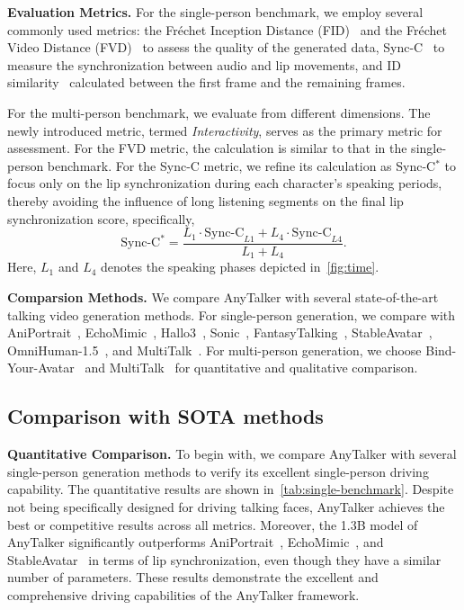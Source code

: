 \noindent \textbf{Evaluation Metrics.}
For the single-person benchmark, we employ several commonly used metrics: the Fréchet Inception Distance (FID)~\cite{heusel2017gans} and the Fréchet Video Distance (FVD)~\cite{unterthiner2019fvd} to assess the quality of the generated data, Sync-C~\cite{chung2016out} to measure the synchronization between audio and lip movements, and ID similarity~\cite{deng2019arcface} calculated between the first frame and the remaining frames.

For the multi-person benchmark, we evaluate from different dimensions. 
The newly introduced metric, termed \textit{Interactivity}, serves as the primary metric for assessment. 
For the FVD metric, the calculation is similar to that in the single-person benchmark. 
For the Sync-C metric, we refine its calculation as Sync-C$^{*}$ to focus only on the lip synchronization during each character's speaking periods, thereby avoiding the influence of long listening segments on the final lip synchronization score, specifically,
\begin{equation}
\text{Sync-C}^{*} = \frac{L_1 \cdot \text{Sync-C}_{L1} + L_4 \cdot \text{Sync-C}_{L4}}{L_1 + L_4}.
\end{equation}
Here, $L_1$ and $L_4$ denotes the speaking phases depicted in~\cref{fig:time}.

\noindent \textbf{Comparsion Methods.}
We compare AnyTalker with several state-of-the-art talking video generation methods.
For single-person generation, we compare with AniPortrait~\cite{wei2024aniportrait}, EchoMimic~\cite{chen2025echomimic}, Hallo3~\cite{cui2025hallo3}, Sonic~\cite{ji2025sonic}, FantasyTalking~\cite{wang2025fantasytalking}, StableAvatar~\cite{tu2025stableavatar}, OmniHuman-1.5~\cite{jiang2025omnihuman}, and MultiTalk~\cite{kong2025let}.
For multi-person generation, we choose Bind-Your-Avatar~\cite{huang2025bind} and MultiTalk~\cite{kong2025let} for quantitative and qualitative comparison.


\subsection{Comparison with SOTA methods}
\noindent \textbf{Quantitative Comparison.}
To begin with, we compare AnyTalker with several single-person generation methods to verify its excellent single-person driving capability. 
The quantitative results are shown in~\cref{tab:single-benchmark}. 
Despite not being specifically designed for driving talking faces, AnyTalker achieves the best or competitive results across all metrics. 
Moreover, the 1.3B model of AnyTalker significantly outperforms AniPortrait~\cite{wei2024aniportrait}, EchoMimic~\cite{chen2025echomimic}, and StableAvatar~\cite{tu2025stableavatar} in terms of lip synchronization, even though they have a similar number of parameters. 
These results demonstrate the excellent and comprehensive driving capabilities of the AnyTalker framework.

